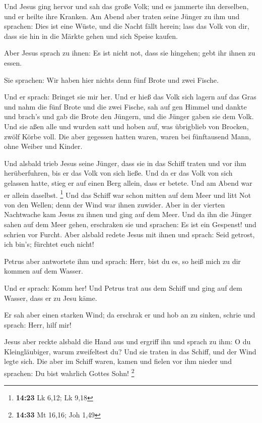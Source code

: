  Und Jesus ging hervor und sah das große Volk; und es
jammerte ihn derselben, und er heilte ihre Kranken.  Am
Abend aber traten seine Jünger zu ihm und sprachen: Dies ist eine Wüste,
und die Nacht fällt herein; lass das Volk von dir, dass sie hin in die
Märkte gehen und sich Speise kaufen.

 Aber Jesus sprach zu ihnen: Es ist nicht not, dass sie
hingehen; gebt ihr ihnen zu essen.

 Sie sprachen: Wir haben hier nichts denn fünf Brote und
zwei Fische.

 Und er sprach: Bringet sie mir her.  Und
er hieß das Volk sich lagern auf das Gras und nahm die fünf Brote und
die zwei Fische, sah auf gen Himmel und dankte und brach's und gab die
Brote den Jüngern, und die Jünger gaben sie dem Volk. 
Und sie aßen alle und wurden satt und hoben auf, was übrigblieb von
Brocken, zwölf Körbe voll.  Die aber gegessen hatten
waren, waren bei fünftausend Mann, ohne Weiber und Kinder.

 Und alsbald trieb Jesus seine Jünger, dass sie in das
Schiff traten und vor ihm herüberfuhren, bis er das Volk von sich ließe.
 Und da er das Volk von sich gelassen hatte, stieg er auf
einen Berg allein, dass er betete. Und am Abend war er allein daselbst.
\footnote{\textbf{14:23} Lk 6,12; Lk 9,18}  Und das
Schiff war schon mitten auf dem Meer und litt Not von den Wellen; denn
der Wind war ihnen zuwider.  Aber in der vierten
Nachtwache kam Jesus zu ihnen und ging auf dem Meer.  Und
da ihn die Jünger sahen auf dem Meer gehen, erschraken sie und sprachen:
Es ist ein Gespenst! und schrien vor Furcht.  Aber
alsbald redete Jesus mit ihnen und sprach: Seid getrost, ich bin's;
fürchtet euch nicht!

 Petrus aber antwortete ihm und sprach: Herr, bist du es,
so heiß mich zu dir kommen auf dem Wasser.

 Und er sprach: Komm her! Und Petrus trat aus dem Schiff
und ging auf dem Wasser, dass er zu Jesu käme.

 Er sah aber einen starken Wind; da erschrak er und hob
an zu sinken, schrie und sprach: Herr, hilf mir!

 Jesus aber reckte alsbald die Hand aus und ergriff ihn
und sprach zu ihm: O du Kleingläubiger, warum zweifeltest du?
 Und sie traten in das Schiff, und der Wind legte sich.
 Die aber im Schiff waren, kamen und fielen vor ihm
nieder und sprachen: Du bist wahrlich Gottes Sohn! \footnote{\textbf{14:33}
  Mt 16,16; Joh 1,49}

